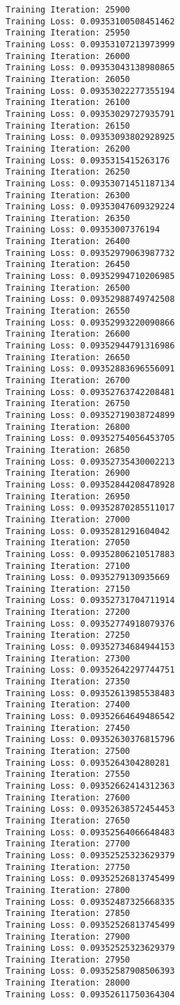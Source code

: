 \documentclass[11pt]{article}
\begin{document}
\begin{Verbatim}[commandchars=\\\{\}]
Training Iteration: 25900
Training Loss: 0.09353100508451462
Training Iteration: 25950
Training Loss: 0.09353107213973999
Training Iteration: 26000
Training Loss: 0.09353043138980865
Training Iteration: 26050
Training Loss: 0.09353022277355194
Training Iteration: 26100
Training Loss: 0.09353029727935791
Training Iteration: 26150
Training Loss: 0.09353093802928925
Training Iteration: 26200
Training Loss: 0.0935315415263176
Training Iteration: 26250
Training Loss: 0.09353071451187134
Training Iteration: 26300
Training Loss: 0.09353047609329224
Training Iteration: 26350
Training Loss: 0.09353007376194
Training Iteration: 26400
Training Loss: 0.09352979063987732
Training Iteration: 26450
Training Loss: 0.09352994710206985
Training Iteration: 26500
Training Loss: 0.09352988749742508
Training Iteration: 26550
Training Loss: 0.09352993220090866
Training Iteration: 26600
Training Loss: 0.09352944791316986
Training Iteration: 26650
Training Loss: 0.09352883696556091
Training Iteration: 26700
Training Loss: 0.09352763742208481
Training Iteration: 26750
Training Loss: 0.09352719038724899
Training Iteration: 26800
Training Loss: 0.09352754056453705
Training Iteration: 26850
Training Loss: 0.09352735430002213
Training Iteration: 26900
Training Loss: 0.09352844208478928
Training Iteration: 26950
Training Loss: 0.09352870285511017
Training Iteration: 27000
Training Loss: 0.0935281291604042
Training Iteration: 27050
Training Loss: 0.09352806210517883
Training Iteration: 27100
Training Loss: 0.0935279130935669
Training Iteration: 27150
Training Loss: 0.09352731704711914
Training Iteration: 27200
Training Loss: 0.09352774918079376
Training Iteration: 27250
Training Loss: 0.09352734684944153
Training Iteration: 27300
Training Loss: 0.09352642297744751
Training Iteration: 27350
Training Loss: 0.09352613985538483
Training Iteration: 27400
Training Loss: 0.09352664649486542
Training Iteration: 27450
Training Loss: 0.09352630376815796
Training Iteration: 27500
Training Loss: 0.0935264304280281
Training Iteration: 27550
Training Loss: 0.09352662414312363
Training Iteration: 27600
Training Loss: 0.09352638572454453
Training Iteration: 27650
Training Loss: 0.09352564066648483
Training Iteration: 27700
Training Loss: 0.09352525323629379
Training Iteration: 27750
Training Loss: 0.09352526813745499
Training Iteration: 27800
Training Loss: 0.09352487325668335
Training Iteration: 27850
Training Loss: 0.09352526813745499
Training Iteration: 27900
Training Loss: 0.09352525323629379
Training Iteration: 27950
Training Loss: 0.09352587908506393
Training Iteration: 28000
Training Loss: 0.09352611750364304

\end{Verbatim}
\end{document}
